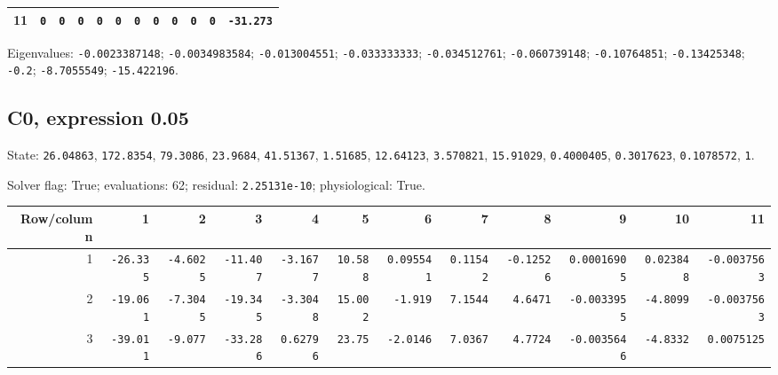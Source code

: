 \begin{landscape}
\begin{tabular}{rrrrrrrrrrrr}
11 & \texttt{0} & \texttt{0} & \texttt{0} & \texttt{0} & \texttt{0} & \texttt{0} & \texttt{0} & \texttt{0} & \texttt{0} & \texttt{0} & \texttt{-31.273} \\

\bottomrule\end{tabular}\par\endgroup

{\scriptsize Eigenvalues: \texttt{-0.0023387148}; \texttt{-0.0034983584}; \texttt{-0.013004551}; \texttt{-0.033333333}; \texttt{-0.034512761}; \texttt{-0.060739148}; \texttt{-0.10764851}; \texttt{-0.13425348}; \texttt{-0.2}; \texttt{-8.7055549}; \texttt{-15.422196}.\par}

\clearpage
\subsection*{C0, expression 0.05}
{\scriptsize State: \texttt{26.04863}, \texttt{172.8354}, \texttt{79.3086}, \texttt{23.9684}, \texttt{41.51367}, \texttt{1.51685}, \texttt{12.64123}, \texttt{3.570821}, \texttt{15.91029}, \texttt{0.4000405}, \texttt{0.3017623}, \texttt{0.1078572}, \texttt{1}.\par

Solver flag: True; evaluations: 62; residual: \texttt{2.25131e-10}; physiological: True.\par}

\begingroup\scriptsize\setlength{\tabcolsep}{3pt}\centering
\begin{tabular}{rrrrrrrrrrrr}\toprule

Row/column & 1 & 2 & 3 & 4 & 5 & 6 & 7 & 8 & 9 & 10 & 11 \\ \midrule

1 & \texttt{-26.335} & \texttt{-4.6025} & \texttt{-11.407} & \texttt{-3.1677} & \texttt{10.588} & \texttt{0.095541} & \texttt{0.11542} & \texttt{-0.12526} & \texttt{0.00016905} & \texttt{0.023848} & \texttt{-0.0037563} \\

2 & \texttt{-19.061} & \texttt{-7.3045} & \texttt{-19.345} & \texttt{-3.3048} & \texttt{15.002} & \texttt{-1.919} & \texttt{7.1544} & \texttt{4.6471} & \texttt{-0.0033955} & \texttt{-4.8099} & \texttt{-0.0037563} \\

3 & \texttt{-39.011} & \texttt{-9.077} & \texttt{-33.286} & \texttt{0.62796} & \texttt{23.75} & \texttt{-2.0146} & \texttt{7.0367} & \texttt{4.7724} & \texttt{-0.0035646} & \texttt{-4.8332} & \texttt{0.0075125} \\


\end{tabular}
\end{landscape}

